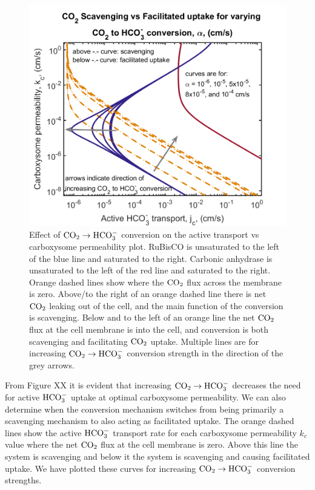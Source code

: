 \documentclass[]{article}
\begin{document}
\begin{figure}[h!]
	\includegraphics[width = \textwidth]{alpha_scavenging.png}
	\caption{Effect of ${\rm CO_2} \rightarrow {\rm HCO_3^-}$ conversion on the active transport vs carboxysome permeability plot. RuBisCO is unsaturated to the left of the blue line and saturated to the right. Carbonic anhydrase is unsaturated to the left of the red line and saturated to the right. Orange dashed lines show where the ${\rm CO_2}$ flux across the membrane is zero. Above/to the right of an orange dashed line there is net ${\rm CO_2}$ leaking out of the cell, and the main function of the conversion is scavenging. Below and to the left of an orange line the net ${\rm CO_2}$ flux at the cell membrane is into the cell, and conversion is both scavenging and facilitating ${\rm CO_2}$ uptake. Multiple lines are for increasing  ${\rm CO_2} \rightarrow {\rm HCO_3^-}$ conversion strength in the direction of the grey arrows. }
\end{figure}

From Figure XX it is evident that increasing ${\rm CO_2} \rightarrow{\rm HCO_3^-}$ decreases the need for active  ${\rm HCO_3^-}$ uptake at optimal carboxysome permeability. We can also determine when the conversion mechanism switches from being primarily a scavenging mechanism to also acting as facilitated uptake. The orange dashed lines show the active ${\rm HCO_3^-}$ transport rate for each carboxysome permeability $k_c$ value where the net ${\rm CO_2}$ flux at the cell membrane is zero. Above this line the system is scavenging and below it the system is scavenging and causing facilitated uptake. We have plotted these curves for increasing ${\rm CO_2} \rightarrow{\rm HCO_3^-}$ conversion strengths. 
\end{document}
